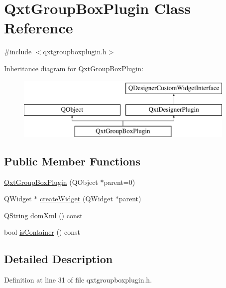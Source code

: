 \hypertarget{class_qxt_group_box_plugin}{\section{Qxt\-Group\-Box\-Plugin Class Reference}
\label{class_qxt_group_box_plugin}
}


{\ttfamily \#include $<$qxtgroupboxplugin.\-h$>$}

Inheritance diagram for Qxt\-Group\-Box\-Plugin\-:\begin{figure}[H]
\begin{center}
\leavevmode
\includegraphics[height=3.000000cm]{class_qxt_group_box_plugin}
\end{center}
\end{figure}
\subsection*{Public Member Functions}
\begin{DoxyCompactItemize}
\item 
\hyperlink{class_qxt_group_box_plugin_afc5085b83a3f83e7140f96d06c9f18ba}{Qxt\-Group\-Box\-Plugin} (Q\-Object $\ast$parent=0)
\item 
Q\-Widget $\ast$ \hyperlink{class_qxt_group_box_plugin_ac3066dc4a55a2c9a9ec565d2d062344e}{create\-Widget} (Q\-Widget $\ast$parent)
\item 
\hyperlink{group___u_a_v_objects_plugin_gab9d252f49c333c94a72f97ce3105a32d}{Q\-String} \hyperlink{class_qxt_group_box_plugin_ad9356db2cfdc5939c269776fa0405194}{dom\-Xml} () const 
\item 
bool \hyperlink{class_qxt_group_box_plugin_a9626c7872a7a00057b4467ffb81c64d2}{is\-Container} () const 
\end{DoxyCompactItemize}


\subsection{Detailed Description}


Definition at line 31 of file qxtgroupboxplugin.\-h.



